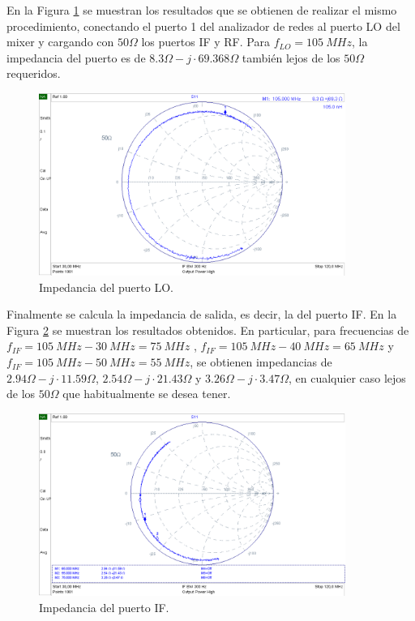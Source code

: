 \documentclass[a4paper,10pt]{article}
\begin{document}
	En la Figura \ref{impedancia2} se muestran los resultados que se obtienen de realizar el mismo procedimiento, conectando el puerto 1 del analizador de redes al puerto LO del mixer y cargando con $50\Omega$ los puertos IF y RF. Para $f_{LO}=105~MHz$, la impedancia del puerto es de $8.3\Omega-j\cdot69.368\Omega$ tambi\'en lejos de los $50\Omega$ requeridos.
	
	\begin{figure}[!htb]
		\centering
		\includegraphics[width=10cm]{Images/impedanciaLO.png}
		\caption{Impedancia del puerto LO.}
		\label{impedancia2}		
	\end{figure}
	
	Finalmente se calcula la impedancia de salida, es decir, la del puerto IF. En la Figura \ref{impedancia3} se muestran los resultados obtenidos. En particular, para  frecuencias de $f_{IF}=105~MHz-30~MHz=75~MHz$
	, $f_{IF}=105~MHz-40~MHz=65~MHz$ y $f_{IF}=105~MHz-50~MHz=55~MHz$, se obtienen impedancias de $2.94\Omega-j\cdot11.59\Omega$, $2.54\Omega-j\cdot21.43\Omega$ y $3.26\Omega-j\cdot3.47\Omega$, en cualquier caso lejos de los $50\Omega$ que habitualmente se desea tener.
	
	\begin{figure}[!htb]
		\centering
		\includegraphics[width=10cm]{Images/impedanciaIF.png}
		\caption{Impedancia del puerto IF.}
		\label{impedancia3}
	\end{figure}			
	
\end{document}
